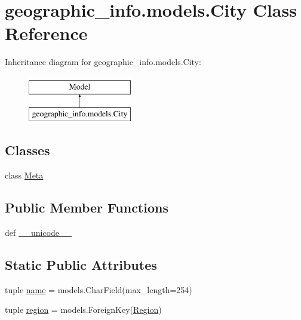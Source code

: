 \hypertarget{classgeographic__info_1_1models_1_1_city}{\section{geographic\-\_\-info.\-models.\-City Class Reference}
\label{classgeographic__info_1_1models_1_1_city}
}
Inheritance diagram for geographic\-\_\-info.\-models.\-City\-:\begin{figure}[H]
\begin{center}
\leavevmode
\includegraphics[height=2.000000cm]{classgeographic__info_1_1models_1_1_city}
\end{center}
\end{figure}
\subsection*{Classes}
\begin{DoxyCompactItemize}
\item 
class \hyperlink{classgeographic__info_1_1models_1_1_city_1_1_meta}{Meta}
\end{DoxyCompactItemize}
\subsection*{Public Member Functions}
\begin{DoxyCompactItemize}
\item 
def \hyperlink{classgeographic__info_1_1models_1_1_city_aef1d35852c4010e9dc820c67d9a3a5fc}{\-\_\-\-\_\-unicode\-\_\-\-\_\-}
\end{DoxyCompactItemize}
\subsection*{Static Public Attributes}
\begin{DoxyCompactItemize}
\item 
tuple \hyperlink{classgeographic__info_1_1models_1_1_city_aa090c90b7b44f3ea7665fc898b7b5ed7}{name} = models.\-Char\-Field(max\-\_\-length=254)
\item 
tuple \hyperlink{classgeographic__info_1_1models_1_1_city_ab018dd3ae77e10dfebcc374606042e30}{region} = models.\-Foreign\-Key(\hyperlink{classgeographic__info_1_1models_1_1_region}{Region})
\end{DoxyCompactItemize}


